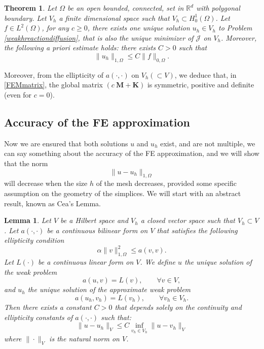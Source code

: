 \documentclass{article}
\newtheorem{theorem}{Theorem}
\newtheorem{lemma}{Lemma}
\begin{document}
\begin{theorem} \label{thm:weakh_existence}
Let $\Omega$ be an open bounded, connected, set in $\mathbb{R}^d$ with polygonal boundary. Let $V_h$ a finite dimensional space such that $V_h \subset H^1_0(\Omega)$. 
Let $f \in L^2(\Omega)$, for any $c\geq0$, there exists one unique solution $u_h\in V_h$ to Problem \eqref{weakhreactiondiffusion}, that is also the unique minimizer of $\mathcal{J}$ on $V_h$. Moreover, the following \emph{a priori} estimate holds: there exists $C>0$ such that
\begin{equation}
    \label{eq:uPriorih}
    \| u_h \|_{1,\Omega} \leq
    C \| f \|_{0,\Omega}.
\end{equation}
\end{theorem}

Moreover, from the ellipticity of $a(\cdot,\cdot)$ on $V_h (\subset V)$, we deduce that, in \eqref{FEMmatrix},
the global matrix $\left ( c \ \mathbf{M} + \mathbf{K} \right )$ is symmetric, positive and definite (even for $c=0$).

\subsection{Accuracy of the FE approximation}

Now we are ensured that both solutions $u$ and $u_h$ exist, and are not multiple, we can say something about the accuracy of the FE approximation, and we will show that the norm
\[
\| u - u_h \|_{1,\Omega}
\]
will decrease when the size $h$ of the mesh decreases, provided some specific assumption on the geometry of the simplices. We will start with an abstract result, known as Cea's Lemma. 

\begin{lemma}
\label{CeaLemma}
Let $V$ be a Hilbert space and $V_h$ a closed vector space such that $V_h \subset V$. Let $a(\cdot,\cdot)$ be a continuous bilinear form on $V$ that satisfies the following ellipticity condition
\[
\alpha \| v \|^2_{1,\Omega}
\leq
 a(v,v).
\]
Let $L(\cdot)$ be a continuous linear form on $V$. We define $u$ the unique solution of the weak problem 
\[
a(u,v) = L(v),\qquad \forall v \in V,
\]
and $u_h$ the unique solution of the approximate weak problem
\[
a(u_h,v_h) = L(v_h),\qquad \forall v_h \in V_h.
\]
Then there exists a constant $C>0$ that depends solely on the continuity and ellipticity constants of $a(\cdot,\cdot)$ %
such that:
\begin{equation}
    \| u - u_h \|_V \leq C
    \inf_{v_h \in V_h} \| u - v_h \|_V
\end{equation}
where $\| \cdot \|_V$ is the natural norm on $V$.
\end{lemma}
\end{document}
